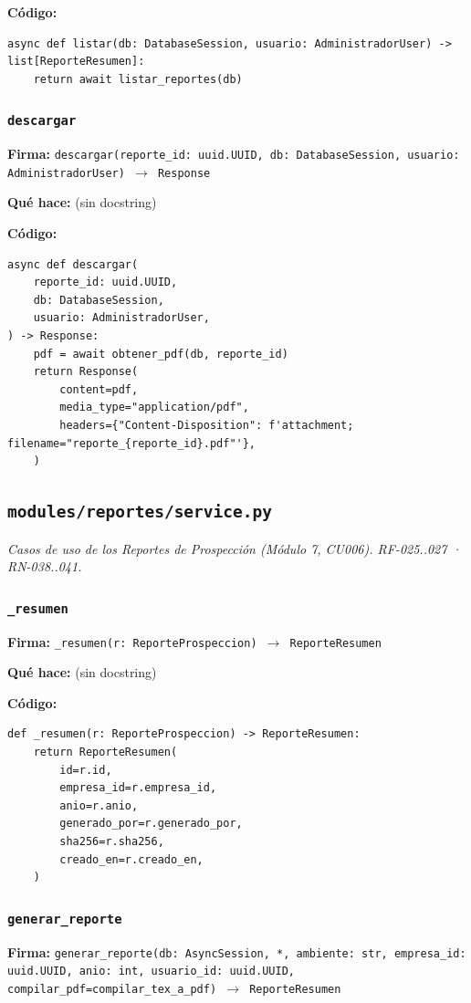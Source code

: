 \documentclass[11pt,a4paper]{article}
\begin{document}
\textbf{Código:}
\begin{lstlisting}
async def listar(db: DatabaseSession, usuario: AdministradorUser) -> list[ReporteResumen]:
    return await listar_reportes(db)
\end{lstlisting}

\subsubsection*{\texttt{descargar}}
\textbf{Firma:} \texttt{descargar(reporte\_id: uuid.UUID, db: DatabaseSession, usuario: AdministradorUser) $\rightarrow$ Response}

\textbf{Qué hace:} (sin docstring)

\textbf{Código:}
\begin{lstlisting}
async def descargar(
    reporte_id: uuid.UUID,
    db: DatabaseSession,
    usuario: AdministradorUser,
) -> Response:
    pdf = await obtener_pdf(db, reporte_id)
    return Response(
        content=pdf,
        media_type="application/pdf",
        headers={"Content-Disposition": f'attachment; filename="reporte_{reporte_id}.pdf"'},
    )
\end{lstlisting}

\subsection{\texttt{modules/reportes/service.py}}
\textit{Casos de uso de los Reportes de Prospección (Módulo 7, CU006). RF-025..027 · RN-038..041.}

\subsubsection*{\texttt{\_resumen}}
\textbf{Firma:} \texttt{\_resumen(r: ReporteProspeccion) $\rightarrow$ ReporteResumen}

\textbf{Qué hace:} (sin docstring)

\textbf{Código:}
\begin{lstlisting}
def _resumen(r: ReporteProspeccion) -> ReporteResumen:
    return ReporteResumen(
        id=r.id,
        empresa_id=r.empresa_id,
        anio=r.anio,
        generado_por=r.generado_por,
        sha256=r.sha256,
        creado_en=r.creado_en,
    )
\end{lstlisting}

\subsubsection*{\texttt{generar\_reporte}}
\textbf{Firma:} \texttt{generar\_reporte(db: AsyncSession, *, ambiente: str, empresa\_id: uuid.UUID, anio: int, usuario\_id: uuid.UUID, compilar\_pdf=compilar\_tex\_a\_pdf) $\rightarrow$ ReporteResumen}
\end{document}
